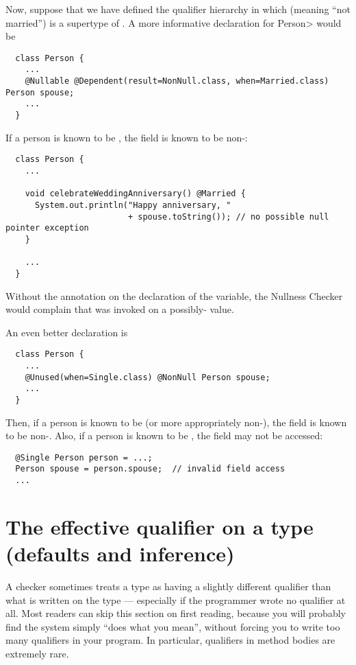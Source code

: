 Now, suppose that we have defined the qualifier hierarchy in which
 (meaning ``not married'') is a supertype of .
A more informative declaration for \<Person> would be

\begin{Verbatim}
  class Person {
    ...
    @Nullable @Dependent(result=NonNull.class, when=Married.class) Person spouse;
    ...
  }
\end{Verbatim}

If a person is known to be , the
 field is known to be non-:

\begin{Verbatim}
  class Person {
    ...

    void celebrateWeddingAnniversary() @Married {
      System.out.println("Happy anniversary, "
                         + spouse.toString()); // no possible null pointer exception
    }

    ...
  }
\end{Verbatim}

\noindent
Without the  annotation on the
declaration of the  variable, the Nullness Checker would
complain that  was invoked on a possibly-
value.

An even better declaration is

\begin{Verbatim}
  class Person {
    ...
    @Unused(when=Single.class) @NonNull Person spouse;
    ...
  }
\end{Verbatim}

Then, if a person is known to be  (or more
appropriately non-), the  field is known to
be non-.  Also, if a person is known to be ,
the  field may not be accessed:

\begin{Verbatim}
  @Single Person person = ...;
  Person spouse = person.spouse;  // invalid field access
  ...
\end{Verbatim}


\section{The effective qualifier on a type (defaults and inference)\label{effective-qualifier}}

A checker sometimes treats a type as having a slightly different qualifier
than what is written on the type --- especially if the programmer wrote no
qualifier at all.
Most readers can skip this section on first reading, because you will
probably find the system simply ``does what you mean'', without forcing
you to write too many qualifiers in your program.
In particular, qualifiers in method bodies are extremely rare.

